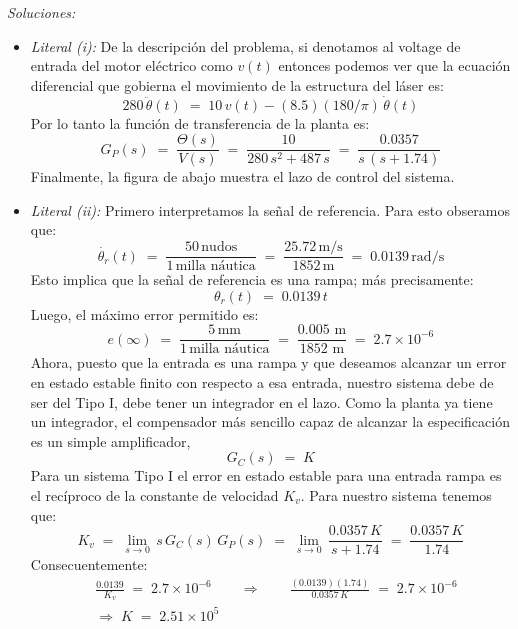 \documentclass[ a4paper, twoside, 11pt]{article}
\begin{document}
\begin{problem}
\emph{Soluciones:}
\begin{itemize}
\item \emph{Literal (i):} De la descripci\'on del problema, si denotamos al voltage de entrada del motor el\'ectrico como $v(t)$ entonces podemos ver que la ecuaci\'on diferencial que gobierna el movimiento de la estructura del l\'aser es: 
\[
280 \, \ddot{\theta}(t) \; = \; 10 \, v(t) - (8.5)(180/\pi) \, \dot{\theta}(t)
\]
Por lo tanto la funci\'on de transferencia de la planta es: 
\[
G_P(s) \; = \; \frac{\Theta(s)}{V(s)} \; = \;
\frac{10}{ 280 \, s^2 + 487 \,s } \; = \; \frac{0.0357}{ s \, ( s + 1.74 )}
\]
Finalmente, la figura de abajo muestra el lazo de control del sistema. 
\begin{figure}[htb]
\centering
\def\svgwidth{0.8\columnwidth}

\end{figure}
\item \emph{Literal (ii):} Primero interpretamos la se\~nal de referencia. Para esto obseramos que: 
\[
\dot{\theta_r}(t) \; = \; 
\frac{50 \, \text{nudos}}{1 \, \text{milla n\'autica}} \; = \; 
\frac{25.72 \, \text{m/s}}{1852 \, \text{m}} \; = \; 0.0139 \, \text{rad/s}
\]
Esto implica que la se\~nal de referencia es una rampa; m\'as precisamente: 
\[
\theta_r(t) \; = \; 0.0139 \, t
\]
Luego, el m\'aximo error permitido es: 
\[
e(\infty) \; = \; \frac{5 \, \text{mm}}{1 \, \text{milla n\'autica}} \; = \; \frac{0.005 \text{ m}}{1852 \text{ m}} \; = \; 2.7 \times 10^{-6}
\]
Ahora, puesto que la entrada es una rampa y que deseamos alcanzar un error en estado estable finito con respecto a esa entrada, nuestro sistema debe de ser del Tipo I, \ie debe tener un integrador en el lazo. Como la planta ya tiene un integrador, el compensador m\'as sencillo capaz de alcanzar la especificaci\'on es un simple amplificador, \iec
\[
G_C(s) \; = \; K
\]
Para un sistema Tipo I el error en estado estable para una entrada rampa es el rec\'iproco de la constante de velocidad $K_v$. Para nuestro sistema tenemos que: 
\[
K_v \; = \; \lim_{ s \rightarrow 0 } \, s \, G_C(s) \, G_P(s)
\; = \; \lim_{ s \rightarrow 0 } \, \frac{0.0357 \, K}{s + 1.74} \; = \; \frac{0.0357 \, K}{1.74}
\]
Consecuentemente: 
\begin{align*}
& \frac{0.0139}{K_v} \; = \; 2.7 \times 10^{-6} \qquad
\Longrightarrow \qquad \frac{(0.0139)(1.74)}{0.0357 \, K} \; = \; 2.7 \times 10^{-6} \\[1ex]
& \Longrightarrow \; K \; = \; 2.51 \times 10^5

\end{align*}
\end{itemize}
\end{problem}
\end{document}

